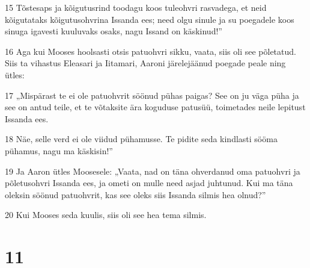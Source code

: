 \par 15 Tõstesaps ja kõigutusrind toodagu koos tuleohvri rasvadega, et neid kõigutataks kõigutusohvrina Issanda ees; need olgu sinule ja su poegadele koos sinuga igavesti kuuluvaks osaks, nagu Issand on käskinud!”
\par 16 Aga kui Mooses hoolsasti otsis patuohvri sikku, vaata, siis oli see põletatud. Siis ta vihastus Eleasari ja Iitamari, Aaroni järelejäänud poegade peale ning ütles:
\par 17 „Mispärast te ei ole patuohvrit söönud pühas paigas? See on ju väga püha ja see on antud teile, et te võtaksite ära koguduse patusüü, toimetades neile lepitust Issanda ees.
\par 18 Näe, selle verd ei ole viidud pühamusse. Te pidite seda kindlasti sööma pühamus, nagu ma käskisin!”
\par 19 Ja Aaron ütles Moosesele: „Vaata, nad on täna ohverdanud oma patuohvri ja põletusohvri Issanda ees, ja ometi on mulle need asjad juhtunud. Kui ma täna oleksin söönud patuohvrit, kas see oleks siis Issanda silmis hea olnud?”
\par 20 Kui Mooses seda kuulis, siis oli see hea tema silmis.

\chapter{11}

